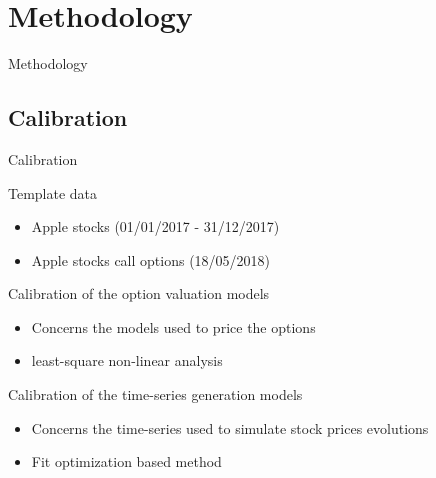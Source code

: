 \documentclass{beamer}
\begin{document}
\section{Methodology}


\begin{frame}{Methodology}

\tableofcontents[currentsection]
 
\end{frame}

\subsection{Calibration}
\begin{frame}{Calibration}

\begin{block}{Template data}
  \begin{itemize}
    \item Apple stocks (01/01/2017 - 31/12/2017)
    \item Apple stocks call options (18/05/2018)
  \end{itemize}
\end{block}

\begin{block}{Calibration of the option valuation models}
  \begin{itemize}
    \item Concerns the models used to price the options
    \item least-square non-linear analysis
  \end{itemize}
\end{block}

\begin{block}{Calibration of the time-series generation models}
  \begin{itemize}
    \item Concerns the time-series used to simulate stock prices evolutions
    \item Fit optimization based method
  \end{itemize}
\end{block}
 
\end{frame}
\end{document}

